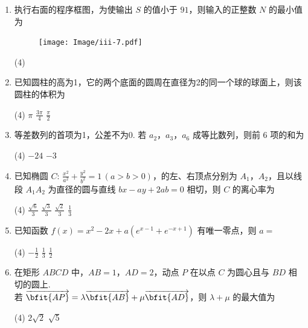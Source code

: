 \documentclass[12pt,space]{ctexart} %
\begin{document}
\begin{enumerate}[itemsep=0.2em,topsep=0pt]
\item 执行右面的程序框图，为使输出 $S$ 的值小于 $91$，则输入的正整数 $N$ 的最小值为
\begin{figure}[htbp]
	\centering
	\texttt{[image: Image/iii-7.pdf]}
\end{figure}
\begin{tasks}(4)
	    
\end{tasks}

\item 已知圆柱的高为1，它的两个底面的圆周在直径为2的同一个球的球面上，则该圆柱的体积为
\begin{tasks}(4)
	\task $\pi$ \task $\frac{3\pi}{4}$ \task $\frac{\pi}{2}$  
\end{tasks}
\item 等差数列的首项为1，公差不为0. 若 $a_2$，$a_3$，$a_6$ 成等比数列，则前 6 项的和为
\begin{tasks}(4)
	\task $-24$ \task $-3$   
\end{tasks}
\item 已知椭圆 $C\colon\,\tfrac{x^2}{a^2}+\tfrac{y^2}{b^2}=1\,(a>b>0)$，的左、右顶点分别为 $A_1$，$A_2$，且以线段 $A_1A_2$ 为直径的圆与直线 $bx-ay+2ab=0$ 相切，则 $C$ 的离心率为
\begin{tasks}(4)
	\task $\frac{\sqrt{6}}{3}$ \task $\frac{\sqrt{3}}{3}$ \task $\frac{\sqrt{2}}{3}$ \task $\frac{1}{3}$ 
\end{tasks}
\item 已知函数 $f(x)=x^2-2x+a(e^{x-1}+e^{-x+1})$ 有唯一零点，则 $a=$
\begin{tasks}(4)
	\task $-\frac{1}{2}$ \task $\frac{1}{3}$ \task $\frac{1}{2}$  
\end{tasks}
\item 在矩形 $ABCD$ 中，$AB=1$，$AD=2$，动点 $P$ 在以点 $C$ 为圆心且与 $BD$ 相切的圆上.\\
若 $\overrightarrow{\bfit{AP}}=\lambda\overrightarrow{\bfit{AB} }+\mu\overrightarrow{\bfit{AD}}$，则 $\lambda+\mu$ 的最大值为
\begin{tasks}(4)
	 \task $2\sqrt{2}$ \task $\sqrt{5}$  
\end{tasks}
\end{enumerate}
\end{document}
